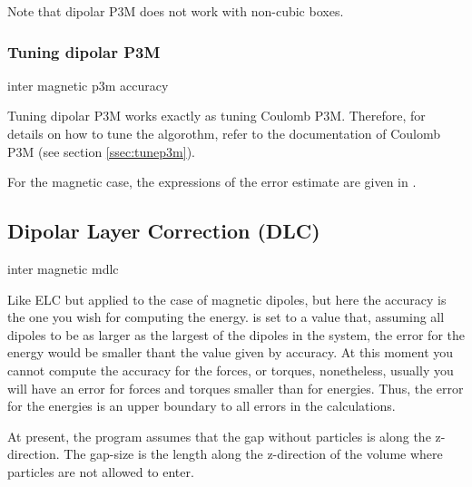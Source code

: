 Note that dipolar P3M does not work with non-cubic boxes.

\subsubsection{Tuning dipolar P3M}
\begin{essyntax}
  inter magnetic  p3m 
  accuracy \\
     
  \begin{features}
  \end{features}
\end{essyntax}

Tuning dipolar P3M works exactly as tuning Coulomb P3M.  Therefore,
for details on how to tune the algorothm, refer to the documentation
of Coulomb P3M (see section \vref{ssec:tunep3m}).

For the magnetic case, the expressions of the error estimate are given
in \cite{cerda08a}.

\subsection{Dipolar Layer Correction (DLC)}

\begin{essyntax}
  inter magnetic mdlc  
  \begin{features}
  \end{features}
\end{essyntax}

Like ELC but applied to the case of magnetic dipoles, but here the
accuracy is the one you wish for computing the energy.
 is set to a value that, assuming all dipoles to be as
larger as the largest of the dipoles in the system, the error for the
energy would be smaller thant the value given by accuracy. At this
moment you cannot compute the accuracy for the forces, or torques,
nonetheless, usually you will have an error for forces and torques
smaller than for energies. Thus, the error for the energies is an
upper boundary to all errors in the calculations.

At present, the program assumes that the gap without particles is
along the z-direction.  The gap-size is the length along the
z-direction of the volume where particles are not allowed to enter.

